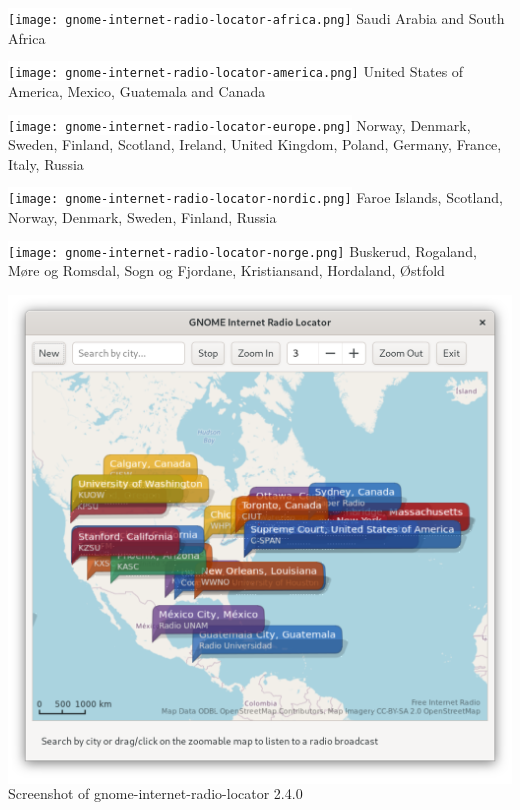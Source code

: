 \documentclass[a4paper,norsk,utf8]{report}
\begin{document}
\begin{center}
\colorbox{white}{\texttt{[image: gnome-internet-radio-locator-africa.png]}}
{\blueem Saudi Arabia and South Africa}
\end{center}

\begin{center}
\colorbox{white}{\texttt{[image: gnome-internet-radio-locator-america.png]}}
{\blueem United States of America, Mexico, Guatemala and Canada}
\end{center}

\begin{center}
\colorbox{white}{\texttt{[image: gnome-internet-radio-locator-europe.png]}}
{\blueem Norway, Denmark, Sweden, Finland, Scotland, Ireland, United Kingdom, Poland, Germany, France, Italy, Russia}
\end{center}

\begin{center}
\colorbox{white}{\texttt{[image: gnome-internet-radio-locator-nordic.png]}}
{\blueem Faroe Islands, Scotland, Norway, Denmark, Sweden, Finland, Russia}
\end{center}

\begin{center}
\colorbox{white}{\texttt{[image: gnome-internet-radio-locator-norge.png]}}
{\blueem Buskerud, Rogaland, Møre og Romsdal, Sogn og Fjordane, Kristiansand, Hordaland, Østfold}
\end{center}

\newpage

\begin{center}
\colorbox{white}{\includegraphics[width=1.0\hsize]{screenshot.png}}
{\blueem Screenshot of gnome-internet-radio-locator 2.4.0}
\end{center}
\end{document}
